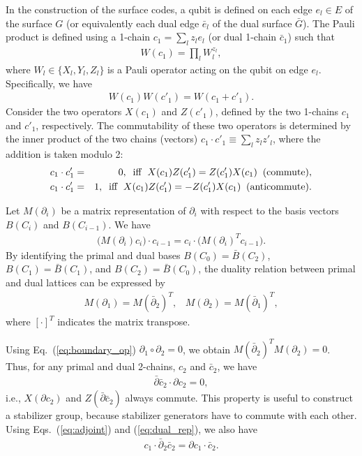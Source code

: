 In the construction of the surface codes, a qubit is defined on each edge $e_l \in E$ of the surface $G$ (or equivalently each dual edge $\bar e_l$ of the dual surface $\bar G$).
The Pauli product is defined using a 1-chain $c_1 = \sum _l z_l e_l$ (or dual 1-chain $\bar c_1$) such that
\begin{eqnarray}
W(c_1) = \prod _{l} W_l^{z_l},
\end{eqnarray}
where $W_l \in \{X_l , Y_l,Z_l \}$ is a Pauli operator acting on the qubit on edge $e_l$.
Specifically, we have 
\begin{eqnarray}
W(c_1)W(c'_1)=W(c_1 + c'_1).
\end{eqnarray}
Consider the two operators $X(c_1)$ and $Z(c'_1)$, defined by the two 1-chains $c_1$ and $c'_1$, respectively.
The commutability of these two operators is determined by the inner product of the two chains (vectors) $c_1\cdot c'_1 \equiv \sum _{l}z_l z'_l$, where the addition is taken modulo 2:
\begin{eqnarray}
c_1\cdot c'_1 &=&0, \;\; {\rm iff} \;\; X(c_1)Z(c'_1)=Z(c'_1)X(c_1) \;\; {\rm (commute)},
\\
c_1\cdot c'_1&=&1, \;\; {\rm iff} \;\; X(c_1)Z(c'_1)=-Z(c'_1)X(c_1) \;\; {\rm (anticommute)}.
\end{eqnarray}

Let $M(\partial _i)$ be a matrix representation of $\partial _i$ with respect to the basis vectors $B(C_i)$ and $B(C_{i-1})$.
We have
\begin{eqnarray}
\bigl(M(\partial _i) c_i \bigr) \cdot c_{i-1} =  c_i \cdot \bigl( M(\partial _i)^{T}  c_{i-1} \bigr).
\label{eq:adjoint}
\end{eqnarray}
By identifying the primal and dual bases $B(C_0)=\bar B(C_2)$, $B(C_1)=\bar B(C_1)$, and $B(C_2)=\bar B(C_0)$, the duality relation between primal and dual lattices can be expressed by
\begin{eqnarray}
M(\partial _1) = M(\bar \partial _2)^{T},
\;\;\;
M(\partial _2) = M(\bar \partial _1)^{T},
\label{eq:dual_rep}
\end{eqnarray}
where $[\cdot]^{T}$ indicates the matrix transpose.

Using Eq.\ (\ref{eq:boundary_op}) $\partial _1 \circ \partial _2=0$, we obtain $ M(\bar \partial _2)^{T} M(\partial _2)=0$.
Thus, for any primal and dual 2-chains, $c_2$ and $\bar c_2$, we have 
\begin{eqnarray}
\bar \partial \bar c_2 \cdot \partial c_2=0,
\label{eq:commutability}
\end{eqnarray}
i.e., $X(\partial c_2)$ and $Z(\bar \partial \bar c_2)$ always commute.
This property is useful to construct a stabilizer group, because stabilizer generators have to commute with each other.
Using Eqs.\ (\ref{eq:adjoint}) and (\ref{eq:dual_rep}), we also have
\begin{eqnarray}
c_1 \cdot \bar \partial _{2} \bar c_2 = \partial c_1 \cdot \bar c_2.
\label{eq:comm_rep}
\end{eqnarray}



